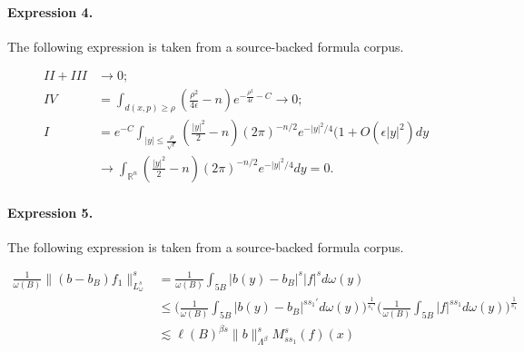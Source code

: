 \documentclass[11pt]{article}
\begin{document}
\paragraph{Expression 4.} The following expression is taken from a source-backed formula corpus.

\begin{align*}II+III &\rightarrow 0;\\IV&= \int_{d(x,p)\geq \rho}(\frac{\rho^2}{4\epsilon}-n)e^{-\frac{\rho^2}{4\epsilon}-C} \rightarrow 0;\\I&= e^{-C}\int_{|y|\leq \frac{\rho}{\sqrt{\epsilon}}} (\frac{|y|^2}{2}-n) (2\pi)^{-n/2} e^{-|y|^2/4}(1+O(\epsilon |y|^2) dy \\&\rightarrow \int_{\mathbb{R}^n} (\frac{|y|^2}{2}-n) (2\pi)^{-n/2} e^{-|y|^2/4} dy=0.\end{align*}

\paragraph{Expression 5.} The following expression is taken from a source-backed formula corpus.

\begin{align*}\frac1{\omega(B)}\|(b-b_B)f_1\|^s_{L^s_\omega}&=\frac1{\omega(B)}\int_{5B} |b(y)-b_B|^s|f|^sd\omega(y) \\&\le { \Big(\frac1{\omega(B)}\int_{5B} |b(y)-b_B|^{ss_1'}d\omega(y) \Big)^{\frac1{s_1'}}} \Big(\frac1{\omega(B)}\int_{5B} |f|^{ss_1} d\omega(y)\Big)^{\frac1{s_1}}\\ &\lesssim \ell(B)^{\beta s}\|b\|^s_{\Lambda^\beta} M^s_{ss_1}(f)(x) \end{align*}
\end{document}
